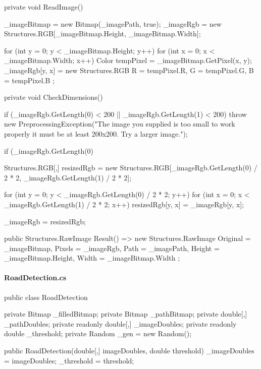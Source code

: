 \begin{flushleft}
\begin{cscode}
{    private void ReadImage()
    {
        _imageBitmap = new Bitmap(_imagePath, true);
        _imageRgb = new Structures.RGB[_imageBitmap.Height, _imageBitmap.Width];
    
        for (int y = 0; y < _imageBitmap.Height; y++)
        {
            for (int x = 0; x < _imageBitmap.Width; x++)
            {
                Color tempPixel = _imageBitmap.GetPixel(x, y);
                _imageRgb[y, x] = new Structures.RGB
                {
                    R = tempPixel.R,
                    G = tempPixel.G,
                    B = tempPixel.B
                };
            }
        }
    }
    
    private void CheckDimensions()
    {
        if (_imageRgb.GetLength(0) < 200 || _imageRgb.GetLength(1) < 200)
            throw new PreprocessingException("The image you supplied is too small to work properly it must be at least 200x200. Try a larger image.");
    
        if (_imageRgb.GetLength(0) %
        {
            Structures.RGB[,] resizedRgb =
                new Structures.RGB[_imageRgb.GetLength(0) / 2 * 2, _imageRgb.GetLength(1) / 2 * 2];
    
            for (int y = 0; y < _imageRgb.GetLength(0) / 2 * 2; y++)
            {
                for (int x = 0; x < _imageRgb.GetLength(1) / 2 * 2; x++)
                {
                    resizedRgb[y, x] = _imageRgb[y, x];
                }
            }
    
            _imageRgb = resizedRgb;
        }
    }
    
    public Structures.RawImage Result() => new Structures.RawImage
    {
        Original = _imageBitmap,
        Pixels = _imageRgb,
        Path = _imagePath,
        Height = _imageBitmap.Height,
        Width = _imageBitmap.Width
    };
}
    \end{cscode}
    
    \paragraph{RoadDetection.cs}
    \begin{cscode}
public class RoadDetection
{
    private Bitmap _filledBitmap;
    private Bitmap _pathBitmap;
    private double[,] _pathDoubles;
    private readonly double[,] _imageDoubles;
    private readonly double _threshold;
    private Random _gen = new Random();

    public RoadDetection(double[,] imageDoubles, double threshold)
    {
        _imageDoubles = imageDoubles;
        _threshold = threshold;
    }

}
\end{cscode}
\end{flushleft}

